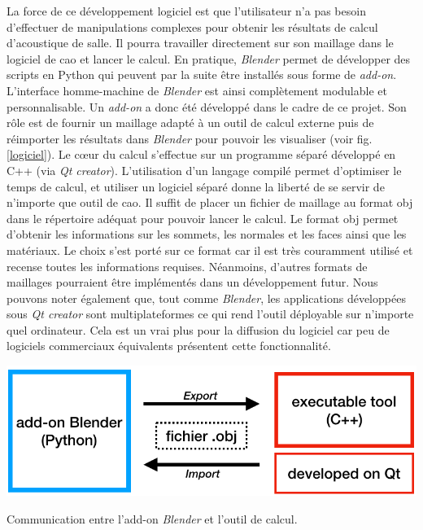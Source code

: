 La force de ce développement logiciel est que l'utilisateur n'a pas besoin d'effectuer de manipulations complexes pour obtenir les résultats de calcul d'acoustique de salle. Il pourra travailler directement sur son maillage dans le logiciel de \gls{cao} et lancer le calcul. En pratique, \textit{Blender} permet de développer des scripts en Python qui peuvent par la suite être installés sous forme de \textit{add-on}. L'interface homme-machine de \textit{Blender} est ainsi complètement modulable et personnalisable. Un \textit{add-on} a donc été développé dans le cadre de ce projet. Son rôle est de fournir un maillage adapté à un outil de calcul externe puis de réimporter les résultats dans \textit{Blender} pour pouvoir les visualiser (voir fig. \ref{logiciel}). Le c\oe{}ur du calcul s'effectue sur un programme séparé développé en C++ (via \textit{Qt creator}). L'utilisation d'un langage compilé permet d'optimiser le temps de calcul, et utiliser un logiciel séparé donne la liberté de se servir de n'importe que outil de \gls{cao}. Il suffit de placer un fichier de maillage au format \gls{obj} dans le répertoire adéquat pour pouvoir lancer le calcul. Le format \gls{obj} permet d'obtenir les informations sur les sommets, les normales et les faces ainsi que les matériaux. Le choix s'est porté sur ce format car il est très couramment utilisé et recense toutes les informations requises. Néanmoins, d'autres formats de maillages pourraient être implémentés dans un développement futur. Nous pouvons noter également que, tout comme \textit{Blender}, les applications développées sous \textit{Qt creator} sont multiplateformes ce qui rend l'outil déployable sur n'importe quel ordinateur. Cela est un vrai plus pour la diffusion du logiciel car peu de logiciels commerciaux équivalents présentent cette fonctionnalité. 

\begin{figureth}
	\includegraphics[width=0.7\linewidth]{images/logiciel}
	\caption{Communication entre l'add-on \textit{Blender} et l'outil de calcul.}
	\label{logiciel}
\end{figureth}


